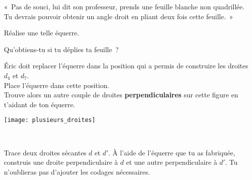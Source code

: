 \begin{activite}
\begin{partie}
\begin{enumerate}
   \end{enumerate} 

  \end{partie}

\end{activite}

\newpage


\begin{activite}

 \begin{minipage}[c]{0.50\linewidth}
  \begin{partie}
 
  « Pas de souci, lui dit son professeur, prends une feuille blanche non quadrillée. Tu devrais pouvoir obtenir un angle droit en pliant deux fois cette feuille. »
  
  Réalise une telle équerre.
  
  Qu'obtiens‑tu si tu déplies ta feuille ? 
    \end{partie}
  
  \begin{partie}
  
  Éric doit replacer l'équerre dans la position qui a permis de construire les droites $d_4$ et $d_7$. \\[0.5em]
  Place l'équerre dans cette position. \\[0.5em]
  Trouve alors un autre couple de droites \textbf{perpendiculaires} sur cette figure en t'aidant de ton équerre.
    \end{partie} \end{minipage} \hfill %
   \begin{minipage}[c]{0.44\linewidth}
   \texttt{[image: plusieurs\_droites]}
   \end{minipage} \\

 \begin{partie}
 
Trace deux droites sécantes $d$ et $d'$. À l'aide de l'équerre que tu as fabriquée, construis une droite perpendiculaire à $d$ et une autre perpendiculaire à $d'$. Tu n'oublieras pas d'ajouter les codages nécessaires.

  \end{partie} 
  
\end{activite}

